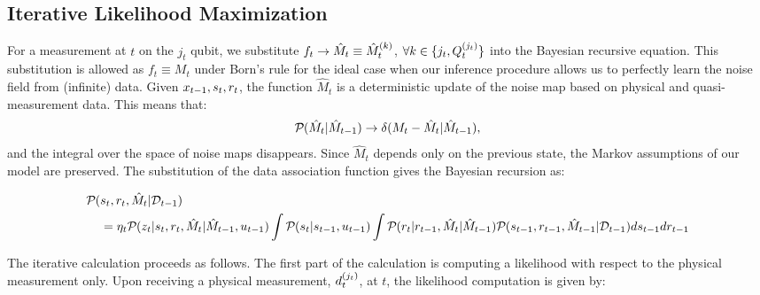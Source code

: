 \subsection{Iterative Likelihood Maximization }
For a measurement at $t$ on the $j_t$ qubit, we  substitute  $ f_{ t} \to \hat{M}_t \equiv \hat{M}_t^{(k)}$,  $ \forall k \in \{j_t, Q^{( j_t )}_{t}\}$ into the Bayesian recursive equation. This substitution is allowed as $f_t \equiv M_t$ under Born's rule for the ideal case when our inference procedure allows us to perfectly learn the noise field from (infinite) data. Given $x_{t-1}, s_{ t}, r_{ t}$, the function $\hat{M}_t$ is a deterministic update of the noise map based on physical and quasi-measurement data. This means that:
\begin{align}
	\mathcal{P}_{} (  \hat{M}_t| \hat{M}_{t-1} )  \to \delta (M_t - \hat{M}_t| \hat{M}_{t-1}),
\end{align} and the integral over the space of noise maps disappears. Since $\hat{M}_t$ depends only on the previous state, the Markov assumptions of our model are preserved. The substitution of the data association function gives the Bayesian recursion as:
\begin{widetext}
\begin{align}
\mathcal{P}_{} ( &s_{ t}, r_{ t}, \hat{M}_{t}| \mathcal{D}_{t-1} ) \nonumber \\
& =  \eta_t\mathcal{P}_{} ( z_t | s_{ t}, r_{ t}, \hat{M}_t| \hat{M}_{t-1}, u_{t-1} )  \int \mathcal{P}_{} (  s_{ t}| s_{ t-1}, u_{t-1} ) \int \mathcal{P}_{} (  r_{ t}|  r_{ t-1}, \hat{M}_t| \hat{M}_{t-1} ) \mathcal{P}_{} ( s_{ t-1}, r_{ t-1}, \hat{M}_{t-1}| \mathcal{D}_{t-1} )  ds_{ t-1} dr_{ t-1} 
\end{align}
\end{widetext} The iterative calculation proceeds as follows. The first part of the calculation is computing a likelihood with respect to the physical measurement only. Upon receiving a physical measurement, $d^{( j_t )}_{t}$, at $t$, the likelihood computation is given by:
